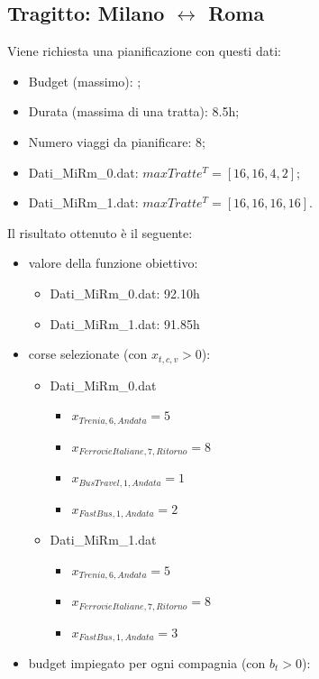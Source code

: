 \documentclass[main.tex]{subfiles}
\begin{document}
\subsection*{Tragitto: Milano $\leftrightarrow$ Roma}
Viene richiesta una pianificazione con questi dati:
\begin{itemize}
    \item Budget (massimo): ;
    \item Durata (massima di una tratta): 8.5h;
    \item Numero viaggi da pianificare: 8;
    \item Dati\_MiRm\_0.dat: $maxTratte^T = [16,16,4,2]$;
    \item Dati\_MiRm\_1.dat: $maxTratte^T = [16,16,16,16]$.
\end{itemize}
Il risultato ottenuto è il seguente:
\begin{itemize}
    \item valore della funzione obiettivo:
    \begin{itemize}
        \item Dati\_MiRm\_0.dat: 92.10h
        \item Dati\_MiRm\_1.dat: 91.85h
    \end{itemize}
    \item corse selezionate (con $x_{t,c,v} > 0$):
    \begin{itemize}
        \item Dati\_MiRm\_0.dat
        \begin{itemize}
            \item $x_{Trenia,6,Andata} = 5$
            \item $x_{FerrovieItaliane,7,Ritorno} = 8$
            \item $x_{BusTravel,1,Andata} = 1$
            \item $x_{FastBus,1,Andata} = 2$
        \end{itemize}
        \item Dati\_MiRm\_1.dat
        \begin{itemize}
            \item $x_{Trenia,6,Andata} = 5$
            \item $x_{FerrovieItaliane,7,Ritorno} = 8$
            \item $x_{FastBus,1,Andata} = 3$
        \end{itemize}
    \end{itemize}
    \item budget impiegato per ogni compagnia (con $b_t > 0$):
    \begin{itemize}

\end{itemize}
\end{itemize}
\end{document}
